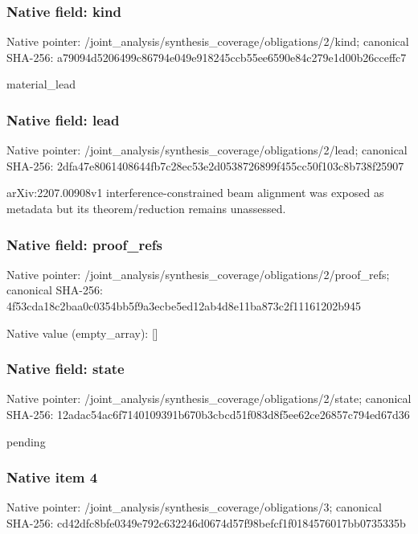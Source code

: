 \documentclass[10pt,a4paper]{article}
\begin{document}
\subsubsection{Native field: kind}
Native pointer: /joint\_\allowbreak{}analysis/synthesis\_\allowbreak{}coverage/obligations/2/kind; canonical SHA-256: a79094d5206499c86794e049e918245ccb55ee6590e84c279e1d00b26cceffc7

\begingroup\raggedright\sloppy material\_\allowbreak{}lead\par\endgroup

\subsubsection{Native field: lead}
Native pointer: /joint\_\allowbreak{}analysis/synthesis\_\allowbreak{}coverage/obligations/2/lead; canonical SHA-256: 2dfa47e8061408644fb7c28ec53e2d0538726899f455cc50f103c8b738f25907

\begingroup\raggedright\sloppy arXiv:\allowbreak{}2207.00908v1 interference-constrained beam alignment was exposed as metadata but its theorem/\allowbreak{}reduction remains unassessed.\par\endgroup

\subsubsection{Native field: proof\_\allowbreak{}refs}
Native pointer: /joint\_\allowbreak{}analysis/synthesis\_\allowbreak{}coverage/obligations/2/proof\_\allowbreak{}refs; canonical SHA-256: 4f53cda18c2baa0c0354bb5f9a3ecbe5ed12ab4d8e11ba873c2f11161202b945

Native value (empty\_\allowbreak{}array): []

\subsubsection{Native field: state}
Native pointer: /joint\_\allowbreak{}analysis/synthesis\_\allowbreak{}coverage/obligations/2/state; canonical SHA-256: 12adac54ac6f7140109391b670b3cbcd51f083d8f5ee62ce26857c794ed67d36

\begingroup\raggedright\sloppy pending\par\endgroup

\subsubsection{Native item 4}
Native pointer: /joint\_\allowbreak{}analysis/synthesis\_\allowbreak{}coverage/obligations/3; canonical SHA-256: cd42dfc8bfe0349e792c632246d0674d57f98befcf1f0184576017bb0735335b
\end{document}
